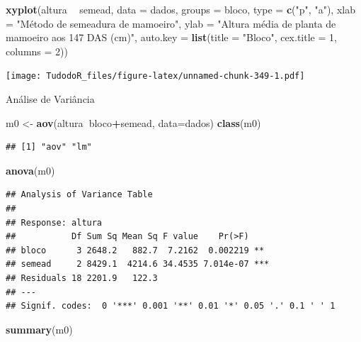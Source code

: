 \documentclass[
]{book}
\newenvironment{Shaded}{\begin{snugshade}}{\end{snugshade}}
\newcommand{\DataTypeTok}[1]{\textcolor[rgb]{0.13,0.29,0.53}{#1}}
\newcommand{\DecValTok}[1]{\textcolor[rgb]{0.00,0.00,0.81}{#1}}
\newcommand{\KeywordTok}[1]{\textcolor[rgb]{0.13,0.29,0.53}{\textbf{#1}}}
\newcommand{\NormalTok}[1]{#1}
\newcommand{\OperatorTok}[1]{\textcolor[rgb]{0.81,0.36,0.00}{\textbf{#1}}}
\newcommand{\StringTok}[1]{\textcolor[rgb]{0.31,0.60,0.02}{#1}}
\begin{document}
\begin{Shaded}
\begin{Highlighting}[]
\KeywordTok{xyplot}\NormalTok{(altura }\OperatorTok{~}\StringTok{ }\NormalTok{semead, }\DataTypeTok{data =}\NormalTok{ dados,}
  \DataTypeTok{groups =}\NormalTok{ bloco, }\DataTypeTok{type =} \KeywordTok{c}\NormalTok{(}\StringTok{"p"}\NormalTok{, }\StringTok{"a"}\NormalTok{),}
  \DataTypeTok{xlab =} \StringTok{"Método de semeadura de mamoeiro"}\NormalTok{,}
  \DataTypeTok{ylab =} \StringTok{"Altura média de planta de mamoeiro aos 147 DAS (cm)"}\NormalTok{,}
  \DataTypeTok{auto.key =} \KeywordTok{list}\NormalTok{(}\DataTypeTok{title =} \StringTok{"Bloco"}\NormalTok{, }\DataTypeTok{cex.title =} \DecValTok{1}\NormalTok{, }\DataTypeTok{columns =} \DecValTok{2}\NormalTok{))}
\end{Highlighting}
\end{Shaded}

\texttt{[image: TudodoR\_files/figure-latex/unnamed-chunk-349-1.pdf]}

Análise de Variância

\begin{Shaded}
\begin{Highlighting}[]
\NormalTok{m0 <-}\StringTok{ }\KeywordTok{aov}\NormalTok{(altura}\OperatorTok{~}\NormalTok{bloco}\OperatorTok{+}\NormalTok{semead, }\DataTypeTok{data=}\NormalTok{dados)}
\KeywordTok{class}\NormalTok{(m0)}
\end{Highlighting}
\end{Shaded}

\begin{verbatim}
## [1] "aov" "lm"
\end{verbatim}

\begin{Shaded}
\begin{Highlighting}[]
\KeywordTok{anova}\NormalTok{(m0)}
\end{Highlighting}
\end{Shaded}

\begin{verbatim}
## Analysis of Variance Table
## 
## Response: altura
##           Df Sum Sq Mean Sq F value    Pr(>F)    
## bloco      3 2648.2   882.7  7.2162  0.002219 ** 
## semead     2 8429.1  4214.6 34.4535 7.014e-07 ***
## Residuals 18 2201.9   122.3                      
## ---
## Signif. codes:  0 '***' 0.001 '**' 0.01 '*' 0.05 '.' 0.1 ' ' 1
\end{verbatim}

\begin{Shaded}
\begin{Highlighting}[]
\KeywordTok{summary}\NormalTok{(m0)}
\end{Highlighting}
\end{Shaded}
\end{document}
